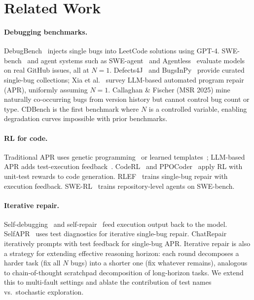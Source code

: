 \documentclass[12pt]{article}
\begin{document}
\section{Related Work}
\label{sec:related}

\paragraph{Debugging benchmarks.}
DebugBench~\cite{tian2024debugbench} injects single bugs into LeetCode
solutions using GPT-4. SWE-bench~\cite{jimenez2024swebench} and agent systems
such as SWE-agent~\cite{yang2024sweagent} and Agentless~\cite{xia2024agentless}
evaluate models on real GitHub issues, all at $N{=}1$.
Defects4J~\cite{just2014defects4j} and BugsInPy~\cite{widyasari2020bugsinpy}
provide curated single-bug collections; Xia et al.~\cite{xia2023automated}
survey LLM-based automated program repair (APR), uniformly assuming $N{=}1$.
Callaghan \& Fischer (MSR 2025) mine naturally co-occurring bugs from version
history but cannot control bug count or type. CDBench is the first benchmark
where $N$ is a controlled variable, enabling degradation curves impossible with
prior benchmarks.

\paragraph{RL for code.}
Traditional APR uses genetic programming~\cite{le2011genprog} or learned
templates~\cite{long2016prophet}; LLM-based APR adds test-execution
feedback~\cite{xia2023automated}. CodeRL~\cite{le2022coderl} and
PPOCoder~\cite{shojaee2023ppocoder} apply RL with unit-test rewards to code
generation. RLEF~\cite{gehring2024rlef} trains single-bug repair with execution
feedback. SWE-RL~\cite{wei2025swerl} trains repository-level agents on
SWE-bench. 

\paragraph{Iterative repair.}
Self-debugging~\cite{chen2023selfdebugging} and
self-repair~\cite{olausson2023selfrepair} feed execution output back to the
model. SelfAPR~\cite{ye2022selfapr} uses test diagnostics for iterative
single-bug repair. ChatRepair~\cite{xia2024chatrepair} iteratively prompts with
test feedback for single-bug APR. Iterative repair is also a strategy for
extending effective reasoning horizon: each round decomposes a harder task
(fix all $N$ bugs) into a shorter one (fix whatever remains), analogous to
chain-of-thought scratchpad decomposition of long-horizon tasks. We extend
this to multi-fault settings and ablate the contribution of test names
vs.\ stochastic exploration.
\end{document}
